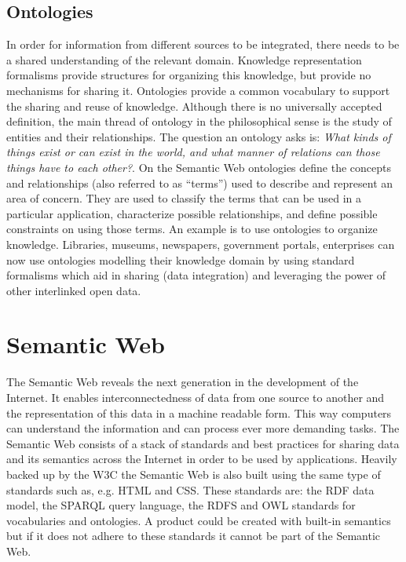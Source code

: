 \subsection{Ontologies}
In order for information from different sources to be integrated, there needs to be a shared understanding of the relevant domain. Knowledge representation formalisms provide structures for organizing this knowledge, but provide no mechanisms for sharing it. Ontologies provide a common vocabulary to support the sharing and reuse of knowledge. Although there is no universally accepted definition, the main thread of ontology in the philosophical sense is the study of entities and their relationships. The question an ontology asks is: \textit{What kinds of things exist or can exist in the world, and what manner of relations can those things have to each other?}. On the Semantic Web ontologies define the concepts and relationships (also referred to as “terms”) used to describe and represent an area of concern. They are used to classify the terms that can be used in a particular application, characterize possible relationships, and define possible constraints on using those terms. An example is to use ontologies to organize knowledge. Libraries, museums, newspapers, government portals, enterprises can now use ontologies modelling their knowledge domain by using standard formalisms which aid in sharing (data integration) and leveraging the power of other interlinked open data.

\section{Semantic Web}
The Semantic Web reveals the next generation in the development of the Internet. It enables interconnectedness of data from one source to another and the representation of this data in a machine readable form. This way computers can understand the information and can process ever more demanding tasks. The Semantic Web consists of a stack of standards and best practices for sharing data and its semantics across the Internet in order to be used by applications. Heavily backed up by the W3C the Semantic Web is also built using the same type of standards such as, e.g. HTML and CSS. These standards are: the RDF data model, the SPARQL query language, the RDFS and OWL standards for vocabularies and ontologies. A product could be created with built-in semantics but if it does not adhere to these standards it cannot be part of the Semantic Web. 

